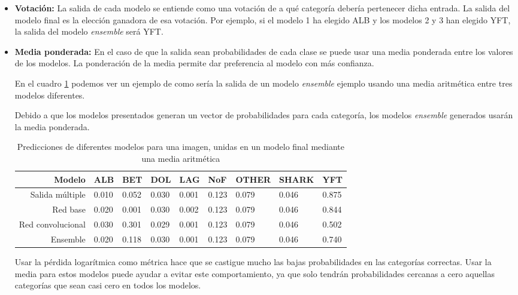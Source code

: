 \begin{itemize}
    \item{\textbf{Votación:} La salida de cada modelo se entiende como una
            votación de a qué categoría debería pertenecer dicha entrada. La
            salida del modelo final es la elección ganadora de esa votación. Por
            ejemplo, si el modelo 1 ha elegido ALB y los modelos 2 y 3 han
        elegido YFT, la salida del modelo \textit{ensemble} será YFT.}
    \item{\textbf{Media ponderada:} En el caso de que la salida sean
            probabilidades de cada clase se puede  usar una media ponderada
            entre los valores de los modelos. La ponderación de la media permite
            dar preferencia al modelo con más confianza.
            
            En el cuadro \ref{ensemble_sample} podemos ver un ejemplo de como
        sería la salida de un modelo \textit{ensemble} ejemplo usando una media
    aritmética entre tres modelos diferentes.}

Debido a que los modelos presentados generan un vector de probabilidades para
cada categoría, los modelos \textit{ensemble} generados usarán la media
ponderada.

\begin{table}[]
\centering
\caption{Predicciones de diferentes modelos para una imagen, unidas en un modelo
final mediante una media aritmética}
\label{ensemble_sample}
\begin{tabular}{rllllllll}
Modelo              & ALB   & BET   & DOL   & LAG   & NoF   & OTHER & SHARK  & YFT  \\
\hline
Salida múltiple     & 0.010 & 0.052 & 0.030 & 0.001 & 0.123 & 0.079 & 0.046 & 0.875\\
Red base            & 0.020 & 0.001 & 0.030 & 0.002 & 0.123 & 0.079 & 0.046 & 0.844\\
Red convolucional   & 0.030 & 0.301 & 0.029 & 0.001 & 0.123 & 0.079 & 0.046 & 0.502\\
\hline
Ensemble            & 0.020 & 0.118 & 0.030 & 0.001 & 0.123 & 0.079 & 0.046 & 0.740
\end{tabular}
\end{table}

Usar la pérdida logarítmica como métrica hace que se castigue mucho las bajas
probabilidades en las categorías correctas. Usar la media para estos modelos
puede ayudar a evitar este comportamiento, ya que solo tendrán probabilidades
cercanas a cero aquellas categorías que sean casi cero en todos los modelos.


\end{itemize}
